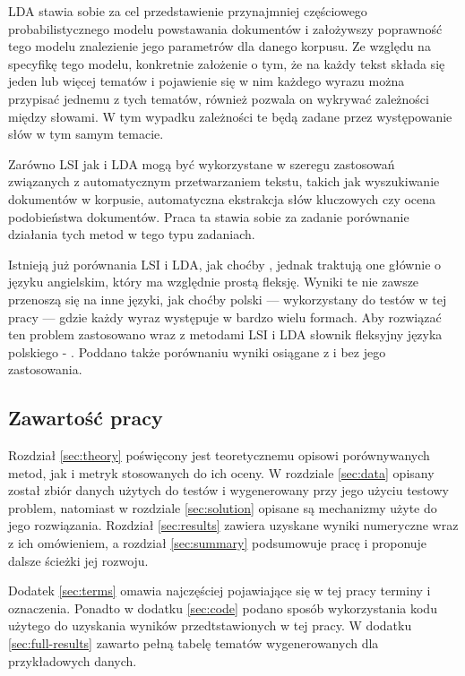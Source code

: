 \documentclass[11pt,a4paper]{article}
\begin{document}
LDA stawia sobie za cel przedstawienie przynajmniej częściowego
probabilistycznego modelu powstawania dokumentów i założywszy poprawność tego
modelu znalezienie jego parametrów dla danego korpusu. Ze względu na specyfikę
tego modelu, konkretnie założenie o tym, że na każdy tekst składa się jeden lub
więcej tematów i pojawienie się w nim każdego wyrazu można przypisać jednemu z
tych tematów, również pozwala on wykrywać zależności między słowami. W tym
wypadku zależności te będą zadane przez występowanie słów w tym samym temacie.

Zarówno LSI jak i LDA mogą być wykorzystane w szeregu zastosowań związanych z
automatycznym przetwarzaniem tekstu, takich jak wyszukiwanie dokumentów w
korpusie, automatyczna ekstrakcja słów kluczowych czy ocena podobieństwa
dokumentów. Praca ta stawia sobie za zadanie porównanie działania tych metod
w tego typu zadaniach.

Istnieją już porównania LSI i LDA, jak choćby \cite{lda-paper}, jednak traktują
one głównie o języku angielskim, który ma względnie prostą fleksję. Wyniki te
nie zawsze przenoszą się na inne języki, jak choćby polski --- wykorzystany do
testów w tej pracy --- gdzie każdy wyraz występuje w bardzo wielu formach. Aby
rozwiązać ten problem zastosowano wraz z metodami LSI i LDA słownik fleksyjny
języka polskiego - \cite{lubaszewski-slownik}. Poddano także porównaniu wyniki
osiągane z i bez jego zastosowania.

\subsection{Zawartość pracy}

Rozdział \ref{sec:theory} poświęcony jest teoretycznemu opisowi porównywanych
metod, jak i metryk stosowanych do ich oceny. W rozdziale \ref{sec:data} opisany
został zbiór danych użytych do testów i wygenerowany przy jego użyciu testowy
problem, natomiast w rozdziale \ref{sec:solution} opisane są mechanizmy użyte
do jego rozwiązania. Rozdział \ref{sec:results} zawiera uzyskane wyniki
numeryczne wraz z ich omówieniem, a rozdział \ref{sec:summary} podsumowuje
pracę i proponuje dalsze ścieżki jej rozwoju.

Dodatek \ref{sec:terms} omawia najczęściej pojawiające się w tej pracy
terminy i oznaczenia.  Ponadto w dodatku \ref{sec:code} podano sposób
wykorzystania kodu użytego do uzyskania wyników przedtstawionych w tej pracy. W
dodatku \ref{sec:full-results} zawarto pełną tabelę tematów wygenerowanych
dla przykładowych danych.
\end{document}
